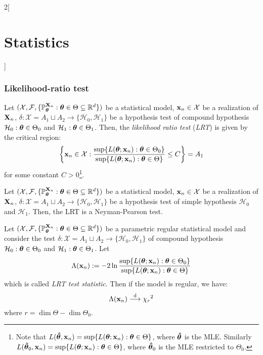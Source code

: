 \documentclass[../../../main.tex]{subfiles}
\begin{document}
\begin{multicols}{2}[\section{Statistics}]
  \subsubsection{Likelihood-ratio test}
  \begin{definition}
    Let $(\mathcal{X},\mathcal{F},\{\mathbb{P}_{\boldsymbol{\mathrm{\theta}}}^{\boldsymbol{\mathrm{X}}_n}:{\boldsymbol{\mathrm{\theta}}}\in\Theta\subseteq\mathbb{R}^d\})$ be a statistical model, $\boldsymbol{\mathrm{x}}_n\in\mathcal{X}$ be a realization of $\boldsymbol{\mathrm{X}}_n$, $\delta:\mathcal{X}=A_1\sqcup A_2\rightarrow\{\mathcal{H}_0,\mathcal{H}_1\}$ be a hypothesis test of compound hypothesis $\mathcal{H}_0:{\boldsymbol{\mathrm{\theta}}}\in\Theta_0$ and $\mathcal{H}_1:{\boldsymbol{\mathrm{\theta}}}\in\Theta_1$.
    Then, the \emph{likelihood ratio test} (\emph{LRT}) is given by the critical region:
    $$\left\{\boldsymbol{\mathrm{x}}_n\in\mathcal{X}:\frac{\sup\{L({\boldsymbol{\mathrm{\theta}}};\boldsymbol{\mathrm{x}}_n):{\boldsymbol{\mathrm{\theta}}}\in\Theta_0\}}{\sup\{L({\boldsymbol{\mathrm{\theta}}};\boldsymbol{\mathrm{x}}_n):{\boldsymbol{\mathrm{\theta}}}\in\Theta\}}\leq C\right\}= A_1$$
    for some constant $C>0$\footnote{Note that $L({\boldsymbol{\mathrm{\hat\theta}}},\boldsymbol{\mathrm{x}}_n)=\sup\{L({\boldsymbol{\mathrm{\theta}}};\boldsymbol{\mathrm{x}}_n):{\boldsymbol{\mathrm{\theta}}}\in\Theta\}$, where ${\boldsymbol{\mathrm{\hat\theta}}}$ is the MLE. Similarly $L({\boldsymbol{\mathrm{\hat\theta}}}_0,\boldsymbol{\mathrm{x}}_n)=\sup\{L({\boldsymbol{\mathrm{\theta}}};\boldsymbol{\mathrm{x}}_n):{\boldsymbol{\mathrm{\theta}}}\in\Theta\}$, where ${\boldsymbol{\mathrm{\hat\theta}}}_0$ is the MLE restricted to $\Theta_0$.}.
  \end{definition}
  \begin{proposition}
    Let $(\mathcal{X},\mathcal{F},\{\mathbb{P}_{\boldsymbol{\mathrm{\theta}}}^{\boldsymbol{\mathrm{X}}_n}:{\boldsymbol{\mathrm{\theta}}}\in\Theta\subseteq\mathbb{R}^d\})$ be a statistical model, $\boldsymbol{\mathrm{x}}_n\in\mathcal{X}$ be a realization of $\boldsymbol{\mathrm{X}}_n$, $\delta:\mathcal{X}=A_1\sqcup A_2\rightarrow\{\mathcal{H}_0,\mathcal{H}_1\}$ be a hypothesis test of simple hypothesis $\mathcal{H}_0$ and $\mathcal{H}_1$. Then, the LRT is a Neyman-Pearson test.
  \end{proposition}
  \begin{theorem}
    Let $(\mathcal{X},\mathcal{F},\{\mathbb{P}_{\boldsymbol{\mathrm{\theta}}}^{\boldsymbol{\mathrm{X}}_n}:{\boldsymbol{\mathrm{\theta}}}\in\Theta\subseteq\mathbb{R}^d\})$ be a parametric regular statistical model and consider the test $\delta:\mathcal{X}=A_1\sqcup A_2\rightarrow\{\mathcal{H}_0,\mathcal{H}_1\}$ of compound hypothesis $\mathcal{H}_0:{\boldsymbol{\mathrm{\theta}}}\in\Theta_0$ and $\mathcal{H}_1:{\boldsymbol{\mathrm{\theta}}}\in\Theta_1$. Let $$\Lambda(\boldsymbol{\mathrm{x}}_n):=-2\ln \frac{\sup\{L({\boldsymbol{\mathrm{\theta}}};\boldsymbol{\mathrm{x}}_n):{\boldsymbol{\mathrm{\theta}}}\in\Theta_0\}}{\sup\{L({\boldsymbol{\mathrm{\theta}}};\boldsymbol{\mathrm{x}}_n):{\boldsymbol{\mathrm{\theta}}}\in\Theta\}}$$ which is called \emph{LRT test statistic}. Then if the model is regular, we have:
    $$\Lambda(\boldsymbol{\mathrm{x}}_n)\overset{\text{d}}{\longrightarrow}{\chi_r}^2$$ where $r=\dim\Theta-\dim\Theta_0$.

\end{theorem}
\end{multicols}
\end{document}
